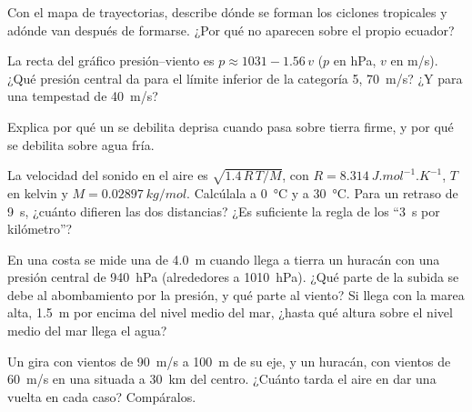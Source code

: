 \begin{exercise}[$\star\star$]\label{exo:g10:storms-and-cyclones:9}
Con el mapa de trayectorias, describe dónde se forman los ciclones tropicales
y adónde van después de formarse. ¿Por qué no aparecen sobre el propio
ecuador?
\end{exercise}

\begin{exercise}[$\star\star$]\label{exo:g10:storms-and-cyclones:10}
La recta del gráfico presión--viento es $p \approx 1031 - 1.56\,v$ ($p$ en
\unit{hPa}, $v$ en \unit{m/s}). ¿Qué presión central da para el límite
inferior de la categoría 5, \qty{70}{m/s}? ¿Y para una tempestad de
\qty{40}{m/s}?
\end{exercise}

\begin{exercise}[$\star\star$]\label{exo:g10:storms-and-cyclones:11}
Explica por qué un  se debilita deprisa cuando pasa sobre
tierra firme, y por qué se debilita sobre agua fría.
\end{exercise}

\begin{exercise}[$\star\star\star$]\label{exo:g10:storms-and-cyclones:12}
La velocidad del sonido en el aire es $\sqrt{1.4\,R\,T/M}$, con $R =
\qty{8.314}{J.mol^{-1}.K^{-1}}$, $T$ en kelvin y $M =
\qty{0.02897}{kg/mol}$. Calcúlala a \qty{0}{\degreeCelsius} y a
\qty{30}{\degreeCelsius}. Para un retraso de \qty{9}{s}, ¿cuánto difieren las
dos distancias? ¿Es suficiente la regla de los ``\qty{3}{s} por kilómetro''?
\end{exercise}

\begin{exercise}[$\star\star\star$]\label{exo:g10:storms-and-cyclones:13}
En una costa se mide una  de \qty{4.0}{m} cuando llega a
tierra un huracán con una presión central de \qty{940}{hPa} (alrededores a
\qty{1010}{hPa}). ¿Qué parte de la subida se debe al abombamiento por la
presión, y qué parte al viento? Si llega con la marea alta, \qty{1.5}{m} por
encima del nivel medio del mar, ¿hasta qué altura sobre el nivel medio del
mar llega el agua?
\end{exercise}

\begin{exercise}[$\star\star\star$]\label{exo:g10:storms-and-cyclones:14}
Un  gira con vientos de \qty{90}{m/s} a \qty{100}{m} de su eje, y un
huracán, con vientos de \qty{60}{m/s} en una  situada a
\qty{30}{km} del centro. ¿Cuánto tarda el aire en dar una vuelta en cada
caso? Compáralos.
\end{exercise}

